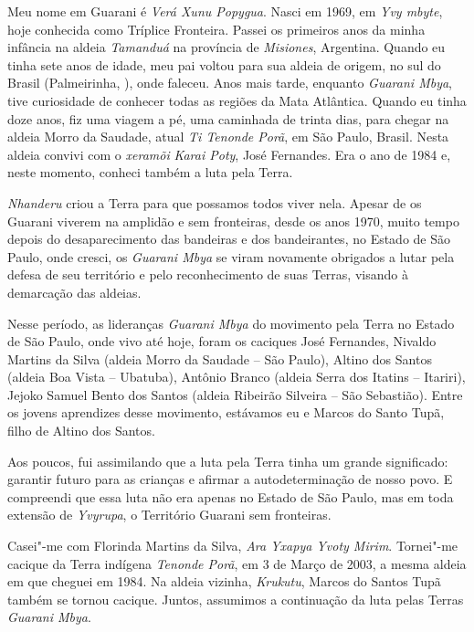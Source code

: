  


 


 

Meu nome em Guarani é \emph{Verá Xunu Popygua}. Nasci em 1969, em
\emph{Yvy mbyte}, hoje conhecida como Tríplice Fronteira. Passei os
primeiros anos da minha infância na aldeia \emph{Tamanduá} na província
de \emph{Misiones}, Argentina. Quando eu tinha sete anos de idade, meu
pai voltou para sua aldeia de origem, no sul do Brasil (Palmeirinha,
), onde faleceu. Anos mais tarde, enquanto \emph{Guarani Mbya}, tive
curiosidade de conhecer todas as regiões da Mata Atlântica. Quando eu
tinha doze anos, fiz uma viagem a pé, uma caminhada de trinta dias, para
chegar na aldeia Morro da Saudade, atual \emph{Ti Tenonde Porã}, em São
Paulo, Brasil. Nesta aldeia convivi com o \emph{xeramõi} \emph{Karai
Poty}, José Fernandes. Era o ano de 1984 e, neste momento, conheci
também a luta pela Terra.

\emph{Nhanderu} criou a Terra para que possamos todos viver nela. Apesar
de os Guarani viverem na amplidão e sem fronteiras, desde os anos 1970,
muito tempo depois do desaparecimento das bandeiras e dos bandeirantes,
no Estado de São Paulo, onde cresci, os \emph{Guarani Mbya} se viram
novamente obrigados a lutar pela defesa de seu território e pelo
reconhecimento de suas Terras, visando à demarcação das aldeias.

 

Nesse período, as lideranças \emph{Guarani Mbya} do movimento pela Terra
no Estado de São Paulo, onde vivo até hoje, foram os caciques José
Fernandes, Nivaldo Martins da Silva (aldeia Morro da Saudade -- São
Paulo), Altino dos Santos (aldeia Boa Vista -- Ubatuba), Antônio Branco
(aldeia Serra dos Itatins -- Itariri), Jejoko Samuel Bento dos Santos
(aldeia Ribeirão Silveira -- São Sebastião). Entre os jovens aprendizes
desse movimento, estávamos eu e Marcos do Santo Tupã, filho de Altino
dos Santos.

Aos poucos, fui assimilando que a luta pela Terra tinha um grande
significado: garantir futuro para as crianças e afirmar a
autodeterminação de nosso povo. E compreendi que essa luta não era
apenas no Estado de São Paulo, mas em toda extensão de \emph{Yvyrupa}, o
Território Guarani sem fronteiras.

Casei"-me com Florinda Martins da Silva, \emph{Ara Yxapya Yvoty Mirim}.
Tornei"-me cacique da Terra indígena \emph{Tenonde Porã}, em 3 de Março
de 2003, a mesma aldeia em que cheguei em 1984. Na aldeia vizinha,
\emph{Krukutu}, Marcos do Santos Tupã também se tornou cacique. Juntos,
assumimos a continuação da luta pelas Terras \emph{Guarani Mbya}.

 

 
